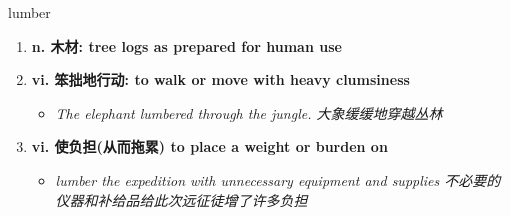 
\begin{frame}
{\huge lumber}
\begin{center}
\begin{enumerate}\Large
  \item \textbf{n. 木材: tree logs as prepared for human use}
  \item \textbf{vi. 笨拙地行动: to walk or move with heavy clumsiness}
  \begin{itemize}
    \item \em{\Large{The elephant lumbered through the jungle. 大象缓缓地穿越丛林}}
  \end{itemize}
  \item \textbf{vi. 使负担(从而拖累) to place a weight or burden on}
  \begin{itemize}
    \item \em{\Large{lumber the expedition with unnecessary equipment and supplies 不必要的仪器和补给品给此次远征徒增了许多负担}}
  \end{itemize}
\end{enumerate}
\end{center}
\end{frame}
